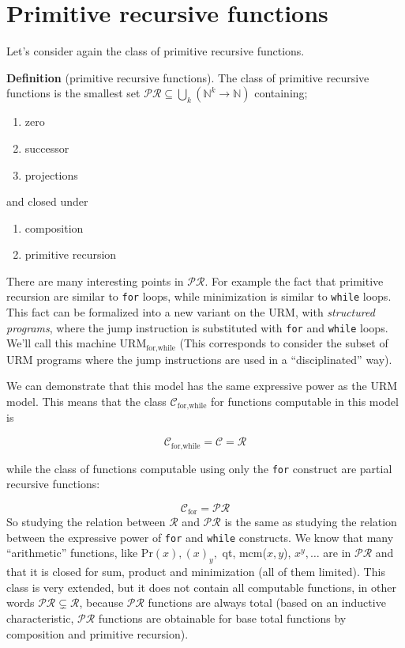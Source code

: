 \chapter{Primitive recursive functions}
Let's consider again the class of primitive recursive functions.

\textbf{Definition} (primitive recursive functions).  The class of
primitive recursive functions is the smallest set
$\mathcal{PR} \subseteq \bigcup\limits_k(\mathbb{N}^k \rightarrow
\mathbb{N})$ containing;

\begin{enumerate}[label=(\alph*)]
\item zero
\item successor
\item projections
\end{enumerate}

and closed under

\begin{enumerate}[label=(\arabic*)]
\item composition
\item primitive recursion
\end{enumerate}

There are many interesting points in $\mathcal{PR}$. For example the
fact that primitive recursion are similar to \texttt{for} loops, while
minimization is similar to \texttt{while} loops. This fact can be
formalized into a new variant on the URM, with \textit{structured
  programs}, where the jump instruction is substituted with
\texttt{for} and \texttt{while} loops. We'll call this machine
$\text{URM}_{\text{for,while}}$ (This corresponds to consider the
subset of URM programs where the jump instructions are used in a
``disciplinated'' way).

We can demonstrate that this model has the same expressive power as the
URM model. This means that the class $\mathcal{C}_{\text{for,while}}$
for functions computable in this model is

\[
  \mathcal{C}_{\text{for,while}} = \mathcal{C} = \mathcal{R}
\]

while the class of functions computable using only the \texttt{for}
construct are partial recursive functions:

\[
  \mathcal{C}_{\text{for}} = \mathcal{PR}
\]
So studying the relation between $\mathcal{R}$ and $\mathcal{PR}$ is
the same as studying the relation between the expressive power of
\texttt{for} and \texttt{while} constructs.  We know that many
``arithmetic'' functions, like Pr$(x), (x)_y,$ qt, mcm($x,y$),
$x^y, \dots$ are in $\mathcal{PR}$ and that it is closed for sum,
product and minimization (all of them limited). This class is very
extended, but it does not contain all computable functions, in other
words $\mathcal{PR} \subsetneq \mathcal{R}$, because $\mathcal{PR}$
functions are always total (based on an inductive characteristic,
$\mathcal{PR}$ functions are obtainable for base total functions by
composition and primitive recursion).

